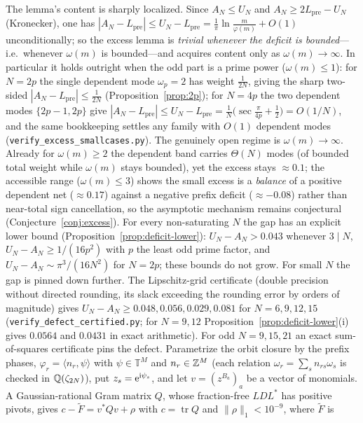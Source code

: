 \begin{remark}
The lemma's content is sharply localized. Since $A_N\le U_N$ and $A_N\ge2L_{\mathrm{pre}}-U_N$ (Kronecker),
one has $|A_N-L_{\mathrm{pre}}|\le U_N-L_{\mathrm{pre}}=\tfrac1\pi\ln\tfrac m{\varphi(m)}+O(1)$
unconditionally; so the excess lemma is \emph{trivial whenever the deficit is bounded}---i.e.\ whenever
$\omega(m)$ is bounded---and acquires content only as $\omega(m)\to\infty$. In particular it holds outright
when the odd part is a prime power ($\omega(m)\le1$): for $N=2p$ the single dependent mode $\omega_p=2$ has
weight $\tfrac1{2N}$, giving the sharp two-sided $|A_N-L_{\mathrm{pre}}|\le\tfrac1{2N}$
(Proposition~\ref{prop:2p}); for $N=4p$ the two dependent modes $\{2p-1,2p\}$ give
$|A_N-L_{\mathrm{pre}}|\le U_N-L_{\mathrm{pre}}=\tfrac1N\bigl(\sec\tfrac\pi{4p}+\tfrac12\bigr)=O(1/N)$, and
the same bookkeeping settles any family with $O(1)$ dependent modes (\texttt{verify\_excess\_smallcases.py}).
The genuinely open regime is $\omega(m)\to\infty$. Already for $\omega(m)\ge2$ the dependent band carries
$\Theta(N)$ modes (of bounded total weight while $\omega(m)$ stays bounded), yet the excess stays $\approx0.1$;
the accessible range ($\omega(m)\le3$) shows the small
excess is a \emph{balance} of a positive dependent net ($\approx0.17$) against a negative prefix deficit
($\approx-0.08$) rather than near-total sign cancellation, so the asymptotic mechanism remains conjectural
(Conjecture~\ref{conj:excess}).
For every non-saturating $N$ the gap has an explicit lower bound
(Proposition~\ref{prop:deficit-lower}): $U_N-A_N>0.043$ whenever $3\mid N$, $U_N-A_N\ge1/(16p^2)$ with $p$ the least
odd prime factor, and $U_N-A_N\sim\pi^3/(16N^2)$ for $N=2p$; these bounds do not grow. For small $N$ the gap is
pinned down further. The Lipschitz-grid certificate (double precision without directed rounding,
its slack exceeding the rounding error by orders of magnitude) gives
$U_N-A_N\ge0.048,0.056,0.029,0.081$ for $N=6,9,12,15$ (\texttt{verify\_defect\_certified.py}; for $N=9,12$
Proposition~\ref{prop:deficit-lower}(i) gives $0.0564$ and $0.0431$ in exact arithmetic). For odd
$N=9,15,21$ an exact sum-of-squares certificate pins the defect. Parametrize the orbit closure by the
prefix phases, $\varphi_r=\langle n_r,\psi\rangle$ with $\psi\in\mathbb T^M$ and $n_r\in\mathbb{Z}^M$ (each relation
$\omega_r=\sum_sn_{rs}\omega_s$ is checked in $\mathbb{Q}(\zeta_{2N})$), put $z_s=\mathrm{e}^{\mathrm i\psi_s}$, and let $v=(z^{B_a})_a$ be a
vector of monomials. A Gaussian-rational Gram matrix $Q$, whose fraction-free $LDL^*$ has positive pivots,
gives $c-\tilde F=v^*Qv+\rho$ with $c=\operatorname{tr}Q$ and $\|\rho\|_1<10^{-9}$, where $\tilde F$ is

\end{remark}
